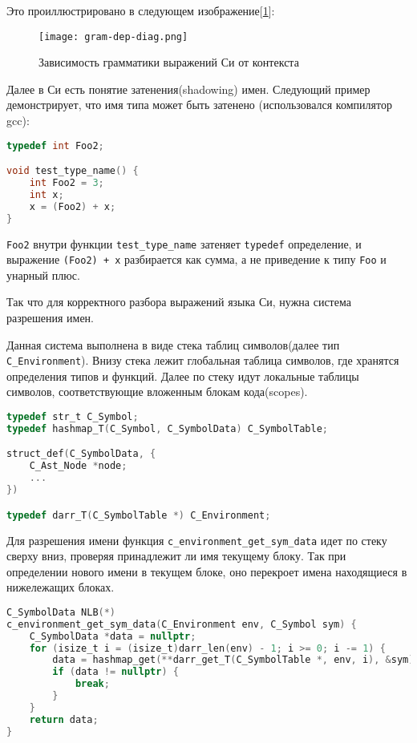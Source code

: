 Это проиллюстрировано в следующем изображение[\ref{parsing:gram-dep-diag}]:
\begin{figure}[h!]
    \texttt{[image: gram-dep-diag.png]}
    \centering
    \caption{Зависимость грамматики выражений Си от контекста}
    \label{parsing:gram-dep-diag}
\end{figure}
\FloatBarrier


Далее в Си есть понятие затенения(shadowing) имен. 
Следующий пример демонстрирует, что имя типа может быть затенено (использовался компилятор gcc):

\begin{lstlisting}[language=c, caption={Пример затенения имен}, label={parsing:name-shadowing-ex}]
typedef int Foo2;

void test_type_name() {
    int Foo2 = 3;
    int x;
    x = (Foo2) + x;
}
\end{lstlisting}

\verb|Foo2| внутри функции \verb|test_type_name| затеняет \verb|typedef| определение, и выражение \verb|(Foo2) + x| разбирается как сумма, 
а не приведение к типу \verb|Foo| и унарный плюс.

Так что для корректного разбора выражений языка Си, нужна система разрешения имен.

Данная система выполнена в виде стека таблиц символов(далее тип \verb|C_Environment|).
Внизу стека лежит глобальная таблица символов, где хранятся определения типов и функций. Далее по стеку идут локальные таблицы символов, соответствующие вложенным блокам кода(scopes).

\begin{lstlisting}[language=c, caption={Определения структур сивола и окружения}, label={parsing:env-struct}]
typedef str_t C_Symbol;
typedef hashmap_T(C_Symbol, C_SymbolData) C_SymbolTable;

struct_def(C_SymbolData, {
    C_Ast_Node *node;
    ...
})

typedef darr_T(C_SymbolTable *) C_Environment;
\end{lstlisting}

Для разрешения имени функция \verb|c_environment_get_sym_data| идет по стеку сверху вниз, проверяя принадлежит ли имя текущему блоку.
Так при определении нового имени в текущем блоке, оно перекроет имена находящиеся в нижележащих блоках. 

\begin{lstlisting}[language=c, caption={Определение функции разрешения имени символа}, label={parsing:get-sym-data-def}]
C_SymbolData NLB(*)
c_environment_get_sym_data(C_Environment env, C_Symbol sym) {
    C_SymbolData *data = nullptr;
    for (isize_t i = (isize_t)darr_len(env) - 1; i >= 0; i -= 1) {
        data = hashmap_get(**darr_get_T(C_SymbolTable *, env, i), &sym);
        if (data != nullptr) {
            break;
        }
    }
    return data;
}
\end{lstlisting}








